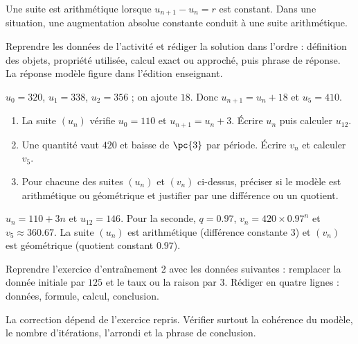    \begin{summary}Une suite est arithmétique lorsque $u_{n+1}-u_n=r$ est constant. Dans une situation, une augmentation absolue constante conduit à une suite arithmétique.\end{summary}

    \begin{example}
    Reprendre les données de l'activité et rédiger la solution dans l'ordre : définition des objets, propriété utilisée, calcul exact ou approché, puis phrase de réponse. La réponse modèle figure dans l'édition enseignant.
    \end{example}
    \begin{solution}$u_0=320$, $u_1=338$, $u_2=356$ ; on ajoute $18$. Donc $u_{n+1}=u_n+18$ et $u_5=410$.\end{solution}

    \begin{exercise}[essentiel]
    \begin{enumerate}\item La suite $(u_n)$ vérifie $u_0=110$ et $u_{n+1}=u_n+3$. Écrire $u_n$ puis calculer $u_{12}$.\item Une quantité vaut $420$ et baisse de $\pc{3}$ par période. Écrire $v_n$ et calculer $v_5$.\item Pour chacune des suites $(u_n)$ et $(v_n)$ ci-dessus, préciser si le modèle est arithmétique ou géométrique et justifier par une différence ou un quotient.\end{enumerate}
    \end{exercise}
    \begin{solution}$u_n=110+3n$ et $u_{12}=146$. Pour la seconde, $q=\num{0,97}$, $v_n=420\times\num{0,97}^n$ et $v_5\approx\num{360,67}$. La suite $(u_n)$ est arithmétique (différence constante $3$) et $(v_n)$ est géométrique (quotient constant $\num{0,97}$).\end{solution}


    \begin{homework}Reprendre l'exercice d'entraînement 2 avec les données suivantes : remplacer la donnée initiale par $125$ et le taux ou la raison par $3$. Rédiger en quatre lignes : données, formule, calcul, conclusion.\end{homework}
    \begin{solution}La correction dépend de l'exercice repris. Vérifier surtout la cohérence du modèle, le nombre d'itérations, l'arrondi et la phrase de conclusion.\end{solution}


